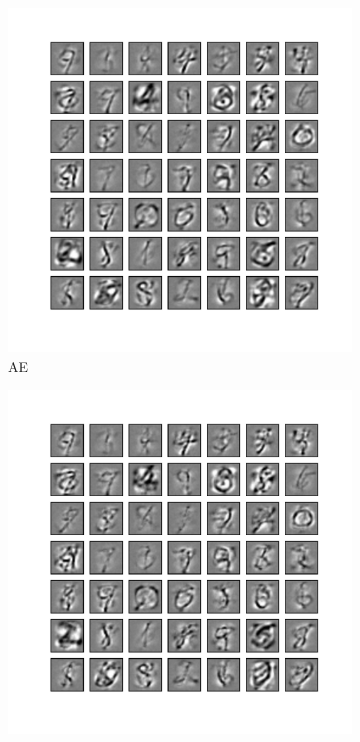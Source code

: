 \DIFdelend \DIFaddbegin \label{subsec:MNIST_weight}
\DIFaddend \begin{figure}
	\centering
	\begin{subfigure}[t]{0.4\textwidth}
		\includegraphics[width=\textwidth]{pics_sdlm/22_MNIST_AE/2_60000_0.pdf}
		\caption{AE}
	\end{subfigure}
	\begin{subfigure}[t]{0.4\textwidth}
		\includegraphics[width=\textwidth]{pics_sdlm/23_MNIST_AE_noise/2_60000_0.pdf}

\end{subfigure}
\end{figure}
